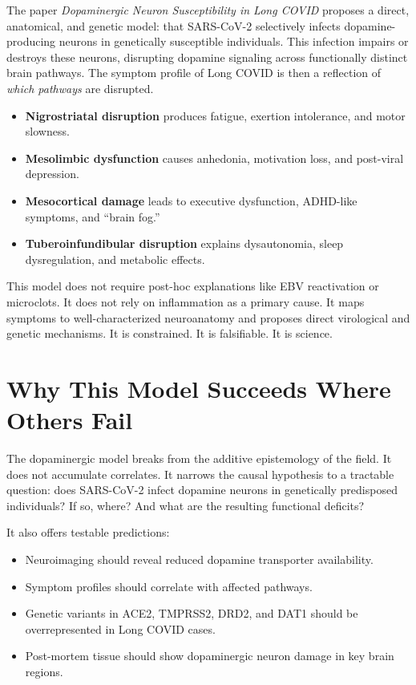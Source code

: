 \documentclass[12pt]{article}
\begin{document}
The paper \textit{Dopaminergic Neuron Susceptibility in Long COVID} proposes a direct, anatomical, and genetic model: that SARS-CoV-2 selectively infects dopamine-producing neurons in genetically susceptible individuals. This infection impairs or destroys these neurons, disrupting dopamine signaling across functionally distinct brain pathways. The symptom profile of Long COVID is then a reflection of \textit{which pathways} are disrupted.

\begin{itemize}
    \item \textbf{Nigrostriatal disruption} produces fatigue, exertion intolerance, and motor slowness.
    \item \textbf{Mesolimbic dysfunction} causes anhedonia, motivation loss, and post-viral depression.
    \item \textbf{Mesocortical damage} leads to executive dysfunction, ADHD-like symptoms, and ``brain fog.''
    \item \textbf{Tuberoinfundibular disruption} explains dysautonomia, sleep dysregulation, and metabolic effects.
\end{itemize}

This model does not require post-hoc explanations like EBV reactivation or microclots. It does not rely on inflammation as a primary cause. It maps symptoms to well-characterized neuroanatomy and proposes direct virological and genetic mechanisms. It is constrained. It is falsifiable. It is science.

\section*{Why This Model Succeeds Where Others Fail}

The dopaminergic model breaks from the additive epistemology of the field. It does not accumulate correlates. It narrows the causal hypothesis to a tractable question: does SARS-CoV-2 infect dopamine neurons in genetically predisposed individuals? If so, where? And what are the resulting functional deficits?

It also offers testable predictions:
\begin{itemize}
    \item Neuroimaging should reveal reduced dopamine transporter availability.
    \item Symptom profiles should correlate with affected pathways.
    \item Genetic variants in ACE2, TMPRSS2, DRD2, and DAT1 should be overrepresented in Long COVID cases.
    \item Post-mortem tissue should show dopaminergic neuron damage in key brain regions.
\end{itemize}
\end{document}
